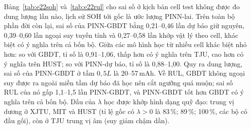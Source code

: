 Bảng~\ref{tab:e22soh} và~\ref{tab:e22rul} cho sai số ở kịch bản cell test không được đo dung lượng lần nào, lịch sử SOH tới gốc là ước lượng PINN-lai. Trên toàn bộ phần đời còn lại, sai số của PINN-GBDT bằng 0{,}21--0{,}46 lần dự báo giữ nguyên, 0{,}39--0{,}60 lần ngoại suy tuyến tính và 0{,}27--0{,}58 lần khớp vật lý theo cell, khác biệt có ý nghĩa trên cả bốn bộ. Giữa các mô hình học từ nhiều cell khác biệt nhỏ hơn: so với GBDT, tỉ số là 0{,}91--1{,}06, thấp hơn có ý nghĩa trên TJU, cao hơn có ý nghĩa trên HUST; so với PINN-dự báo, tỉ số là 0{,}88--1{,}00. Quy ra dung lượng, sai số của PINN-GBDT ở tầm $0{,}5L$ là 20--57\,mAh. Về RUL, GBDT không ngoại suy được ra ngoài miền tầm dự báo đã học nên cắt ngưỡng quá muộn; sai số RUL của nó gấp 1{,}1--1{,}5 lần PINN-GBDT, và PINN-GBDT tốt hơn GBDT có ý nghĩa trên cả bốn bộ. Dấu của $\lambda$ học được khớp hình dạng quỹ đạo: trung vị dương ở XJTU, MIT và HUST (tỉ lệ gốc có $\lambda > 0$ là 83\,\%; 89\,\%; 100\,\%, các bộ có đầu gối), còn ở TJU trung vị âm (suy giảm chậm dần).
